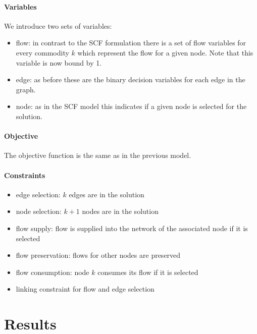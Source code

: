 \documentclass{article}
\begin{document}
\paragraph{Variables}We introduce two sets of variables:
\begin{itemize}
	\item flow: in contrast to the SCF formulation there is a set of flow variables for every commodity $k$ which represent the flow for a given node. Note that this variable is now bound by 1.
	\item edge: as before these are the binary decision variables for each edge in the graph.
	\item node: as in the SCF model this indicates if a given node is selected for the solution.
\end{itemize}

\paragraph{Objective}The objective function is the same as in the previous model. 

\paragraph{Constraints}
\begin{itemize}
	\item edge selection: $k$ edges are in the solution
	\item node selection: $k + 1$ nodes are in the solution
	\item flow supply: flow is supplied into the network of the associated node if it is selected
	\item flow preservation: flows for other nodes are preserved
	\item flow consumption: node $k$ consumes its flow if it is selected
	\item linking constraint for flow and edge selection
\end{itemize}

\section{Results}
\end{document}
